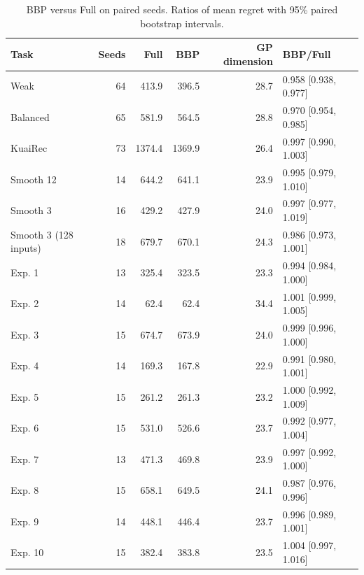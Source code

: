 \begin{table}[htbp]
\centering\small
\caption{BBP versus Full on paired seeds. Ratios of mean regret with 95\% paired bootstrap intervals.}
\label{tab:bbp-results}
\begin{tabular}{@{}lrrrrl@{}}
\toprule
Task & Seeds & Full & BBP & GP dimension & BBP/Full \\
\midrule
Weak & 64 & 413.9 & 396.5 & 28.7 & 0.958 [0.938, 0.977] \\
Balanced & 65 & 581.9 & 564.5 & 28.8 & 0.970 [0.954, 0.985] \\
KuaiRec & 73 & 1374.4 & 1369.9 & 26.4 & 0.997 [0.990, 1.003] \\
Smooth 12 & 14 & 644.2 & 641.1 & 23.9 & 0.995 [0.979, 1.010] \\
Smooth 3 & 16 & 429.2 & 427.9 & 24.0 & 0.997 [0.977, 1.019] \\
Smooth 3 (128 inputs) & 18 & 679.7 & 670.1 & 24.3 & 0.986 [0.973, 1.001] \\
Exp. 1 & 13 & 325.4 & 323.5 & 23.3 & 0.994 [0.984, 1.000] \\
Exp. 2 & 14 & 62.4 & 62.4 & 34.4 & 1.001 [0.999, 1.005] \\
Exp. 3 & 15 & 674.7 & 673.9 & 24.0 & 0.999 [0.996, 1.000] \\
Exp. 4 & 14 & 169.3 & 167.8 & 22.9 & 0.991 [0.980, 1.001] \\
Exp. 5 & 15 & 261.2 & 261.3 & 23.2 & 1.000 [0.992, 1.009] \\
Exp. 6 & 15 & 531.0 & 526.6 & 23.7 & 0.992 [0.977, 1.004] \\
Exp. 7 & 13 & 471.3 & 469.8 & 23.9 & 0.997 [0.992, 1.000] \\
Exp. 8 & 15 & 658.1 & 649.5 & 24.1 & 0.987 [0.976, 0.996] \\
Exp. 9 & 14 & 448.1 & 446.4 & 23.7 & 0.996 [0.989, 1.001] \\
Exp. 10 & 15 & 382.4 & 383.8 & 23.5 & 1.004 [0.997, 1.016] \\
\bottomrule
\end{tabular}
\end{table}

